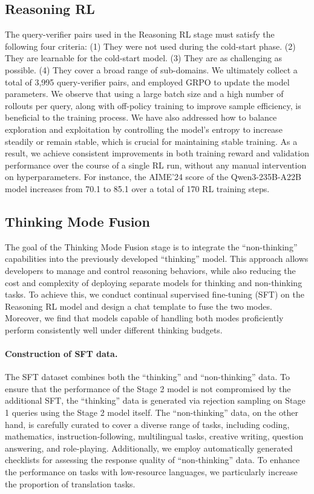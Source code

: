 \documentclass[dvipsnames]{article}
\begin{document}
\subsection{Reasoning RL}

The query-verifier pairs used in the Reasoning RL stage must satisfy the following four criteria:
(1) They were not used during the cold-start phase.
(2) They are learnable for the cold-start model.
(3) They are as challenging as possible.
(4) They cover a broad range of sub-domains.
We ultimately collect a total of 3,995 query-verifier pairs, and employed GRPO \citep{deepseekmath} to update the model parameters.
We observe that using a large batch size and a high number of rollouts per query, along with off-policy training to improve sample efficiency, is beneficial to the training process.
We have also addressed how to balance exploration and exploitation by controlling the model’s entropy to increase steadily or remain stable, which is crucial for maintaining stable training.
As a result, we achieve consistent improvements in both training reward and validation performance over the course of a single RL run, without any manual intervention on hyperparameters. For instance, the AIME'24 score of the Qwen3-235B-A22B model increases from 70.1 to 85.1 over a total of 170 RL training steps.

\subsection{Thinking Mode Fusion}

The goal of the Thinking Mode Fusion stage is to integrate the ``non-thinking'' capabilities into the previously developed ``thinking'' model. 
This approach allows developers to manage and control reasoning behaviors, while also reducing the cost and complexity of deploying separate models for thinking and non-thinking tasks.
To achieve this, we conduct continual supervised fine-tuning (SFT) on the Reasoning RL model and design a chat template to fuse the two modes. 
Moreover, we find that models capable of handling both modes proficiently perform consistently well under different thinking budgets.

\paragraph{Construction of SFT data.} The SFT dataset combines both the ``thinking'' and ``non-thinking'' data. 
To ensure that the performance of the Stage 2 model is not compromised by the additional SFT, the ``thinking'' data is generated via rejection sampling on Stage 1 queries using the Stage 2 model itself. 
The ``non-thinking'' data, on the other hand, is carefully curated to cover a diverse range of tasks, including coding, mathematics, instruction-following, multilingual tasks, creative writing, question answering, and role-playing.
Additionally, we employ automatically generated checklists for assessing the response quality of ``non-thinking'' data. To enhance the performance on tasks with low-resource languages, we particularly increase the proportion of translation tasks.
\end{document}
